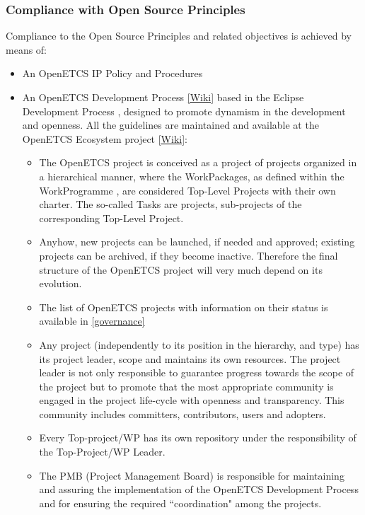 \documentclass{template/openetcs_article}
\begin{document}
\subsubsection{Compliance with Open Source Principles}
Compliance to the Open Source Principles and related objectives is achieved by means of:
\begin{itemize}
\item An OpenETCS \gls{IP} Policy and Procedures \citep{IPP}
\item An OpenETCS Development Process \citep{odp} \href{https://github.com/openETCS/ecosystem/wiki/openETCS-Development-Process}{[Wiki]} based in the Eclipse Development Process \citep{EDP}, designed to promote dynamism in the development and openness. All the guidelines are maintained and available at the OpenETCS Ecosystem project \href{https://github.com/openETCS/ecosystem/wiki/_pages}{[Wiki]}: 
\begin{itemize}
\item The OpenETCS project is conceived as a project of projects organized in a hierarchical manner, where the WorkPackages, as defined within the WorkProgramme \citep{fpp}, are considered Top-Level Projects with their own charter. The so-called Tasks are projects, sub-projects of the corresponding Top-Level Project.
\item Anyhow, new projects can be launched, if needed and approved; existing projects can be archived, if they become inactive. Therefore the final structure of the OpenETCS project will very much depend on its evolution.  
\item The list of OpenETCS projects with information on their status is available in \href{https://github.com/openETCS/governance/wiki/State-of-Deliverables}{[governance]}
\item Any project (independently to its position in the hierarchy, and type) has its project leader, scope and maintains its own resources. The project leader is not only responsible to guarantee progress towards the scope of the project but to promote that the most appropriate community is engaged in the project life-cycle with openness and transparency. This community includes committers, contributors, users and adopters.
\item Every Top-project/\gls{WP} has its own repository under the responsibility of the Top-Project/\gls{WP} Leader.  
\item The PMB (Project Management Board) is responsible for maintaining and assuring the implementation of the OpenETCS Development Process and for ensuring the required “coordination" among the projects.

\end{itemize}
\end{itemize}
\end{document}
